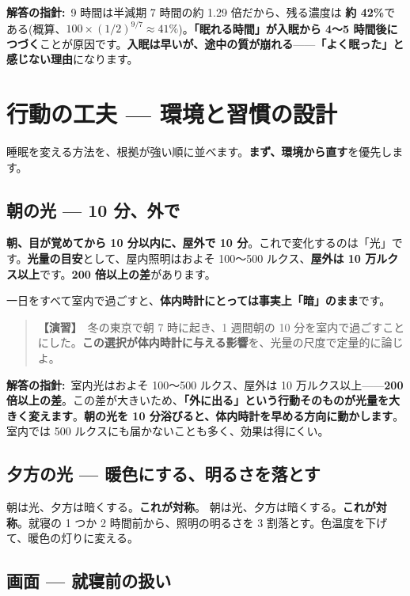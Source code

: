 \documentclass{article}
\begin{document}
\textbf{解答の指針:}\ 9 時間は半減期 7 時間の約 1.29 倍だから、残る濃度は \textbf{約 42\%}である(概算、\(100 \times (1/2)^{9/7} \approx 41\%\))。\textbf{「眠れる時間」が入眠から 4〜5 時間後につづく}ことが原因です。\textbf{入眠は早いが、途中の質が崩れる}——\textbf{「よく眠った」と感じない理由}になります。

\section{行動の工夫 — 環境と習慣の設計}
睡眠を変える方法を、根拠が強い順に並べます。\textbf{まず、環境から直す}を優先します。

\subsection{朝の光 — 10 分、外で}

\textbf{朝、目が覚めてから 10 分以内に、屋外で 10 分}。これで変化するのは「光」です。\textbf{光量の目安}として、屋内照明はおよそ 100〜500 ルクス、\textbf{屋外は 10 万ルクス以上}です。\textbf{200 倍以上の差}があります。

一日をすべて室内で過ごすと、\textbf{体内時計にとっては事実上「暗」のまま}です。

\begin{quote}
\textbf{【演習】}\ 冬の東京で朝 7 時に起き、1 週間朝の 10 分を室内で過ごすことにした。\textbf{この選択が体内時計に与える影響}を、光量の尺度で定量的に論じよ。
\end{quote}

\textbf{解答の指針:}\ 室内光はおよそ 100〜500 ルクス、屋外は 10 万ルクス以上——\textbf{200 倍以上の差}。この差が大きいため、\textbf{「外に出る」という行動そのものが光量を大きく変えます}。\textbf{朝の光を 10 分浴びると、体内時計を早める方向に動かします}。室内では 500 ルクスにも届かないことも多く、効果は得にくい。

\subsection{夕方の光 — 暖色にする、明るさを落とす}

朝は光、夕方は暗くする。\textbf{これが対称}。
朝は光、夕方は暗くする。\textbf{これが対称}。就寝の 1 つか 2 時間前から、照明の明るさを 3 割落とす。色温度を下げて、暖色の灯りに変える。

\subsection{画面 — 就寝前の扱い}
\end{document}

